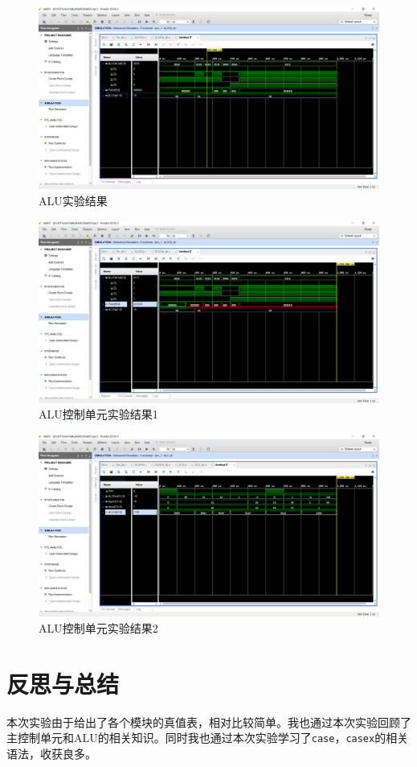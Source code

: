 \documentclass{progartcn}
\begin{document}
\begin{figure}[htbp]
    \centering
    \includegraphics[scale=0.3]{../figure/03/lab03-2.PNG}
    \caption{ALU实验结果}\label{fig:2}
\end{figure}

\begin{figure}[htbp]
    \centering
    \includegraphics[scale=0.3]{../figure/03/lab03-3.PNG}
    \caption{ALU控制单元实验结果1}\label{fig:3}
\end{figure}

\begin{figure}[htbp]
    \centering
    \includegraphics[scale=0.3]{../figure/03/lab03-4.PNG}
    \caption{ALU控制单元实验结果2}\label{fig:4}
\end{figure}

\section{反思与总结}

本次实验由于给出了各个模块的真值表，相对比较简单。我也通过本次实验回顾了主控制单元和ALU的相关知识。同时我也通过本次实验学习了\verb|case|，\verb|casex|的相关语法，收获良多。
\end{document}

